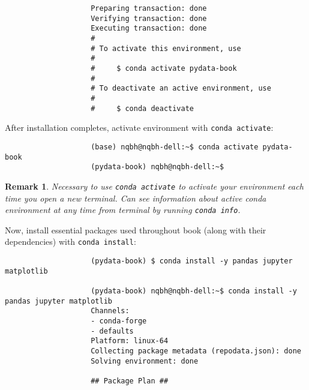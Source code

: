 \documentclass{article}
\newtheorem{remark}{Remark}
\begin{document}
\begin{enumerate}
\begin{itemize}
\begin{itemize}
\begin{itemize}
\begin{verbatim}
					Preparing transaction: done                                                     
					Verifying transaction: done                                                     
					Executing transaction: done                                                     
					#                                                                               
					# To activate this environment, use                                             
					#                                                                               
					#     $ conda activate pydata-book                                              
					#                                                                               
					# To deactivate an active environment, use                                      
					#                                                                               
					#     $ conda deactivate
				\end{verbatim}
				After installation completes, activate environment with {\tt conda activate}:
				\begin{verbatim}
					(base) nqbh@nqbh-dell:~$ conda activate pydata-book                             
					(pydata-book) nqbh@nqbh-dell:~$
				\end{verbatim}
				
				\begin{remark}
					Necessary to use {\tt conda activate} to activate your environment each time you open a new terminal. Can see information about active conda environment at any time from terminal by running {\tt conda info}.
				\end{remark}
				Now, install essential packages used throughout book (along with their dependencies) with {\tt conda install}:
				\begin{verbatim}
					(pydata-book) $ conda install -y pandas jupyter matplotlib
					
					(pydata-book) nqbh@nqbh-dell:~$ conda install -y pandas jupyter matplotlib      
					Channels:                                                                       
					- conda-forge                                                                  
					- defaults                                                                     
					Platform: linux-64                                                              
					Collecting package metadata (repodata.json): done                               
					Solving environment: done                                                       
					
					## Package Plan ##                                                              
					

\end{verbatim}
\end{itemize}
\end{itemize}
\end{itemize}
\end{enumerate}
\end{document}
